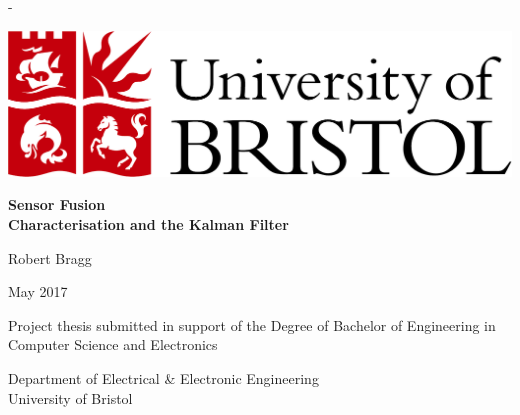 \begin{titlingpage}
\begin{SingleSpace}
\rmfamily
\calccentering{\unitlength} 
\begin{adjustwidth*}{\unitlength}{-\unitlength}
\begin{center}

\includegraphics[scale=0.4]{logos/bristollogo_colour}\\

\vspace{30mm}

{\fontsize{22pt}{27pt}\selectfont\bfseries
Sensor Fusion \\
\vspace{2mm}
Characterisation and the Kalman Filter}

\vspace{38mm}

{\fontsize{18pt}{22pt}\selectfont\bfseries

Robert Bragg

\vspace{10mm}

May 2017

\vspace{27mm}

Project thesis submitted in support of the Degree of Bachelor of Engineering in Computer Science and Electronics

\vspace{14mm}

Department of Electrical \& Electronic Engineering\\
University of Bristol

}

\end{center}

\end{adjustwidth*}
\end{SingleSpace}
\end{titlingpage}